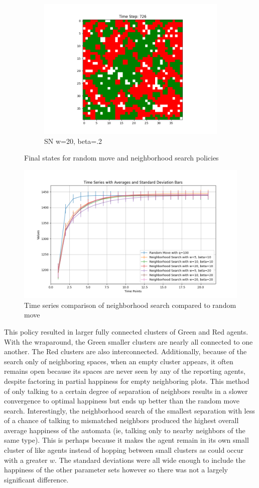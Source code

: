 \documentclass[11pt]{article}
\begin{document}
\begin{figure}[h]
\begin{subfigure}{0.14\textwidth}
			\includegraphics[width=\linewidth]{final_cluster_w20b20.png}
			\caption{\centering SN w=20, beta=.2}
		\end{subfigure}
		\caption{Final states for random move and neighborhood search policies}
	\end{figure}
	\FloatBarrier
	
	\begin{figure}
		\centering
		\includegraphics[width=.5\textwidth]{policies02.png}
		\caption{Time series comparison of neighborhood search compared to random move}
	\end{figure}
	This policy resulted in larger fully connected clusters of Green and Red agents. With the wraparound, the Green smaller clusters are nearly all connected to one another. The Red clusters are also interconnected. Additionally, because of the search only of neighboring spaces, when an empty cluster appears, it often remains open because its spaces are never seen by any of the reporting agents, despite factoring in partial happiness for empty neighboring plots. This method of only talking to a certain degree of separation of neighbors results in a slower convergence to optimal happiness but ends up better than the random move search. Interestingly, the neighborhood search of the smallest separation with less of a chance of talking to mismatched neighbors produced the highest overall average happiness of the automata (ie, talking only to nearby neighbors of the same type). This is perhaps because it makes the agent remain in its own small cluster of like agents instead of hopping between small clusters as could occur with a greater $w$. The standard deviations were all wide enough to include the happiness of the other parameter sets however so there was not a largely significant difference.
	
\end{document}
